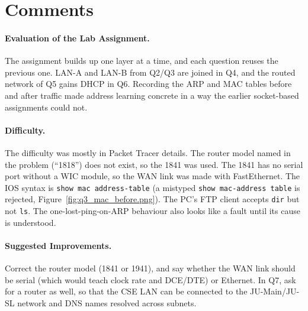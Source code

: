 \documentclass[11pt]{article}
\begin{document}
\section{Comments}

\paragraph{Evaluation of the Lab Assignment.} The assignment builds up one layer at a
time, and each question reuses the previous one. LAN-A and LAN-B from Q2/Q3 are joined in
Q4, and the routed network of Q5 gains DHCP in Q6. Recording the ARP and MAC tables before
and after traffic made address learning concrete in a way the earlier socket-based
assignments could not.

\paragraph{Difficulty.} The difficulty was mostly in Packet Tracer details. The router
model named in the problem (``1818'') does not exist, so the 1841 was used. The 1841 has no
serial port without a WIC module, so the WAN link was made with FastEthernet. The IOS
syntax is \texttt{show mac address-table} (a mistyped \texttt{show mac-address table} is
rejected, Figure~\ref{fig:q3_mac_before.png}). The PC's FTP client accepts \texttt{dir} but
not \texttt{ls}. The one-lost-ping-on-ARP behaviour also looks like a fault until its cause
is understood.

\paragraph{Suggested Improvements.} Correct the router model (1841 or 1941), and say
whether the WAN link should be serial (which would teach clock rate and DCE/DTE) or
Ethernet. In Q7, ask for a router as well, so that the CSE LAN can be connected to the
JU-Main/JU-SL network and DNS names resolved across subnets.
\end{document}
